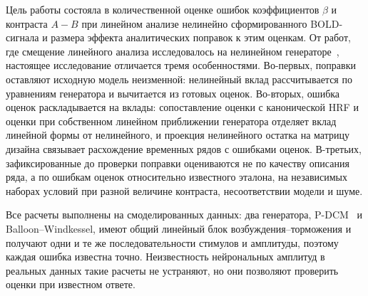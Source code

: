 Цель работы состояла в количественной оценке ошибок коэффициентов $\beta$ и контраста $A-B$ при линейном анализе нелинейно сформированного BOLD-сигнала и размера эффекта аналитических поправок к этим оценкам. От работ, где смещение линейного анализа исследовалось на нелинейном генераторе~\cite{mechelli2001,wager2005}, настоящее исследование отличается тремя особенностями. Во-первых, поправки оставляют исходную модель неизменной: нелинейный вклад рассчитывается по уравнениям генератора и вычитается из готовых оценок. Во-вторых, ошибка оценок раскладывается на вклады: сопоставление оценки с канонической HRF и оценки при собственном линейном приближении генератора отделяет вклад линейной формы от нелинейного, и проекция нелинейного остатка на матрицу дизайна связывает расхождение временных рядов с ошибками оценок. В-третьих, зафиксированные до проверки поправки оцениваются не по качеству описания ряда, а по ошибкам оценок относительно известного эталона, на независимых наборах условий при разной величине контраста, несоответствии модели и шуме.

Все расчеты выполнены на смоделированных данных: два генератора, P-DCM~\cite{havlicek2015} и Balloon--Windkessel, имеют общий линейный блок возбуждения--торможения и получают одни и те же последовательности стимулов и амплитуды, поэтому каждая ошибка известна точно. Неизвестность нейрональных амплитуд в реальных данных такие расчеты не устраняют, но они позволяют проверить оценки при известном ответе.
